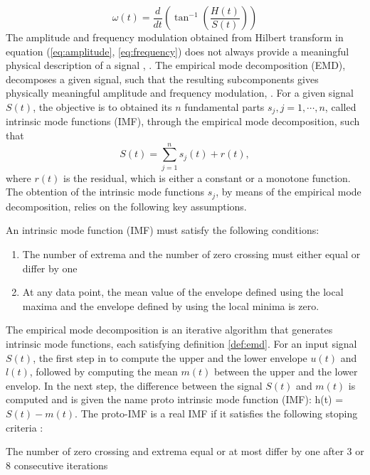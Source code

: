 \documentclass[../Main/thesis.tex]{subfiles}
\begin{document}
\begin{equation}\label{eq:frequency}
\omega(t) = \frac{d}{dt}\left(\tan^{-1}\left(\frac{H(t)}{S(t)} \right) \right)
\end{equation}
The amplitude and frequency modulation obtained from Hilbert transform in equation (\ref{eq:amplitude}, \ref{eq:frequency}) does not always provide a meaningful physical description of a signal \cite{huang98}, \cite{huang08}. The empirical mode decomposition (EMD), decomposes a given signal, such that the resulting subcomponents gives physically meaningful amplitude and frequency modulation, \cite{huang98}. For a given signal $S(t)$, the objective is to obtained its $n$ fundamental parts $s_{j}, j =1,\cdots,n$, called intrinsic mode functions (IMF), through the empirical mode decomposition, such that
\begin{equation}\label{eq:emd-decomposition}
S(t) = \sum_{j=1}^{n}s_{j}(t) + r(t),
\end{equation}
where $r(t)$ is the residual, which is either a constant or a monotone function. The obtention of the intrinsic mode functions $s_{j}$, by means of the empirical mode decomposition, relies on the following key assumptions.
\begin{definition}\label{def:emd}
An intrinsic mode function (IMF) must satisfy the following conditions:
\begin{enumerate}
\item The number of extrema and the number of zero crossing must either equal or differ by one 
\item At any data point, the mean value of the envelope defined using the local maxima and the envelope defined by using the local minima is zero.
\end{enumerate}
\end{definition}
The empirical mode decomposition is an iterative algorithm that generates intrinsic mode functions, each satisfying definition \ref{def:emd}.
For an input signal $S(t)$, the first step in to compute the upper and the lower envelope $u(t)$ and $l(t)$, followed by computing the mean $m(t)$ between the upper and the lower envelop. In the next step, the difference between the signal $S(t)$ and $m(t)$ is computed and is given the name proto intrinsic mode function (IMF): h(t) = $S(t)-m(t)$.
The proto-IMF is a real IMF if it satisfies the following stoping criteria \cite{huang08}:
\begin{stoppage criterion}\label{cr:stoppage}
The number of zero crossing and extrema equal or at most differ by one after 3 or 8 consecutive iterations
\end{stoppage criterion}
\end{document}
